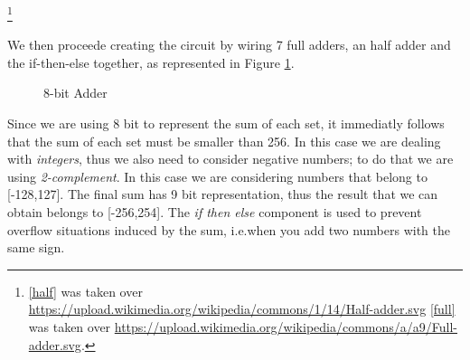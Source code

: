 \documentclass[12pt]{article}
\begin{document}
\footnote{\ref{half} was taken over \url{https://upload.wikimedia.org/wikipedia/commons/1/14/Half-adder.svg} 
\ref{full} was taken over \url{https://upload.wikimedia.org/wikipedia/commons/a/a9/Full-adder.svg}.}

We then proceede creating the circuit by wiring 7 full adders, an half adder and the if-then-else together, as represented in Figure \ref{circuit}.

\begin{figure}[!h]
    \caption{8-bit Adder}\label{circuit}
\end{figure}
Since we are using 8 bit to represent the sum of each set, it immediatly follows that the sum of each set must be smaller than 256. In this case we are dealing with \textit{integers}, thus we also need to consider negative numbers; to do that we are using \textit{2-complement}. In this case we are considering numbers that belong to [-128,127]. The final sum has 9 bit representation, thus the result that we can obtain belongs to [-256,254]. The \textit{if then else} component is used to prevent overflow situations induced by the sum, i.e.when you add two numbers with the same sign.
\end{document}
